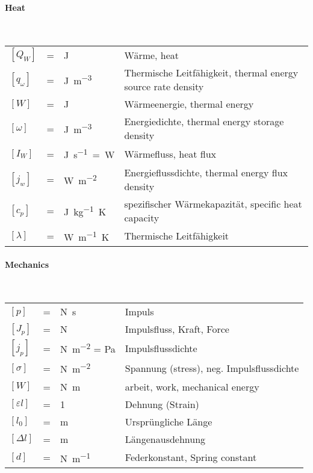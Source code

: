 {\begin{multicols}{2}
		\paragraph{Heat}~\\
		\begin{tabularx}{\linewidth}{lclX}
			$[Q_W]$ &=& \si{\joule} & Wärme, heat\\
			$[q_\omega]$ &=& \si{\joule\per\meter\tothe{3}} & Thermische Leitfähigkeit, thermal energy source rate density \\	
			$[W]$ &=& \si{J} & Wärmeenergie, thermal energy\\
			$[\omega]$ &=& \si{\joule\per\meter\tothe{3}} & Energiedichte, thermal energy storage density \\
			$[I_W]$ &=& \si{\joule\per\second=\watt} & Wärmefluss, heat flux\\
			$[j_w]$ &=& \si{\watt\per\square\meter} & Energieflussdichte, thermal energy flux density \\
			$[c_p]$ &=& \si{\joule\per\kilogram\kelvin} & spezifischer Wärmekapazität, specific heat capacity\\
			$[\lambda]$ &=& \si{\watt\per\meter\kelvin} & Thermische Leitfähigkeit \\	
		\end{tabularx}
		
		\paragraph{Mechanics}~\\
		\begin{tabularx}{\linewidth}{lclX}
			$[p]$ &=& \si{\newton\second} & Impuls \\
			$[J_p]$ &=& \si{\newton} & Impulsfluss, Kraft, Force \\
			$[j_p]$ &=& \si{\newton\per\square\meter} = \si{\pascal} & Impulsflussdichte\\
			$[\sigma]$ &=& \si{\newton\per\square\meter} & Spannung (stress), neg. Impulsflussdichte \\
			$[W]$ &=& \si{\newton\meter} & arbeit, work, mechanical energy\\
			$[\varepsilon l]$ &=& 1& Dehnung (Strain)\\
			$[l_0]$ &=& \si{m} & Ursprüngliche Länge \\
			$[\Delta l]$ &=& \si{m} & Längenausdehnung \\
			$[d]$ &=& \si{\newton\per\meter} & Federkonstant, Spring constant\\
		\end{tabularx}
		

\end{multicols}}
